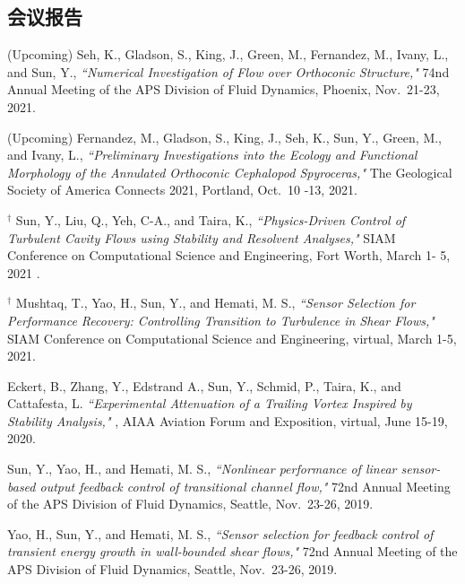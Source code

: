 \documentclass[10pt]{article}
\begin{document}
\subsection*{会议报告} 
{\small
\begin{etaremune}

\item {\color{Blue}(Upcoming)} Seh, K., Gladson, S., King, J., Green, M., Fernandez, M., Ivany, L., and Sun, Y., {\it ``Numerical Investigation of Flow over Orthoconic Structure," } 74nd Annual Meeting of the APS Division of Fluid Dynamics, Phoenix, Nov.~21-23, 2021.

\item {\color{Blue}(Upcoming)} Fernandez, M., Gladson, S., King, J., Seh, K., Sun, Y., Green, M., and Ivany, L., {\it ``Preliminary Investigations into the Ecology and Functional Morphology of the Annulated Orthoconic Cephalopod Spyroceras," } The Geological Society of America Connects 2021, Portland, Oct.~10 -13, 2021.

\item $\boldsymbol {^\dagger}$ Sun, Y., Liu, Q., Yeh, C-A., and Taira, K., {\it ``Physics-Driven Control of Turbulent Cavity Flows using Stability and Resolvent Analyses," } SIAM Conference on Computational Science and Engineering, Fort Worth, March 1- 5, 2021 .

\item $\boldsymbol {^\dagger}$ Mushtaq, T., Yao, H., Sun, Y.,  and Hemati, M. S., {\it ``Sensor Selection for Performance Recovery: Controlling Transition to Turbulence in Shear Flows," } SIAM Conference on Computational Science and Engineering, virtual, March 1-5, 2021. 

\item Eckert, B., Zhang, Y., Edstrand A., Sun, Y., Schmid, P., Taira, K., and Cattafesta, L. {\it ``Experimental Attenuation of a Trailing Vortex Inspired by Stability Analysis," }, AIAA Aviation Forum and Exposition, virtual, June 15-19, 2020. 

\item Sun, Y., Yao, H., and Hemati, M. S., {\it ``Nonlinear performance of linear sensor-based output feedback control of transitional channel flow," } 72nd Annual Meeting of the APS Division of Fluid Dynamics, Seattle, Nov.~23-26, 2019. 

\item Yao, H., Sun, Y., and Hemati, M. S., {\it ``Sensor selection for feedback control of transient energy growth in wall-bounded shear flows," } 72nd Annual Meeting of the APS Division of Fluid Dynamics, Seattle, Nov.~23-26, 2019. 


\end{etaremune}}
\end{document}
